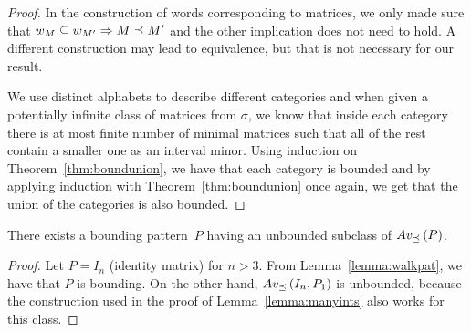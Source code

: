 \begin{proof}
In the construction of words corresponding to matrices, we only made sure that $w_M\subseteq w_{M'}\Rightarrow M\preceq M'$ and the other implication does not need to hold. A different construction may lead to equivalence, but that is not necessary for our result.

We use distinct alphabets to describe different categories and when given a potentially infinite class of matrices from $\sigma$, we know that inside each category there is at most finite number of minimal matrices such that all of the rest contain a smaller one as an interval minor. Using induction on Theorem~\ref{thm:boundunion}, we have that each category is bounded and by applying induction with Theorem~\ref{thm:boundunion} once again, we get that the union of the categories is also bounded.
\end{proof}

\begin{obs}
There exists a bounding pattern~$P$ having an unbounded subclass of $Av_{\preceq}\left(P\right)$.
\end{obs}
\begin{proof}
Let $P=I_n$ (identity matrix) for $n>3$. From Lemma~\ref{lemma:walkpat}, we have that $P$ is bounding. On the other hand, $Av_{\preceq}\left(I_n,P_1\right)$ is unbounded, because the construction used in the proof of Lemma~\ref{lemma:manyints} also works for this class.
\end{proof}

